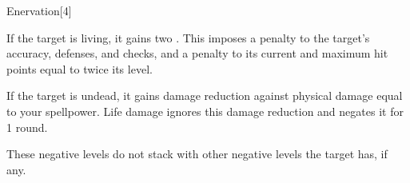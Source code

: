 \begin{spellsection}{Enervation}[4]
    \begin{spellheader}
    \end{spellheader}
    \begin{spellcontent}
        \begin{spelltargetinginfo}
        \end{spelltargetinginfo}
        \begin{spelleffects}
            \spelleffect If the target is living, it gains two . This imposes a  penalty to the target's accuracy, defenses, and checks, and a penalty to its current and maximum hit points equal to twice its level.

            If the target is undead, it gains damage reduction against physical damage equal to your spellpower.
            Life damage ignores this damage reduction and negates it for 1 round.
        \end{spelleffects}
    \end{spellcontent}
    \begin{spellfooter}
        \spellnotes These negative levels do not stack with other negative levels the target has, if any.
        \miscastrandom
    \end{spellfooter}
    \begin{spellaugments}
    \end{spellaugments}
\end{spellsection}

